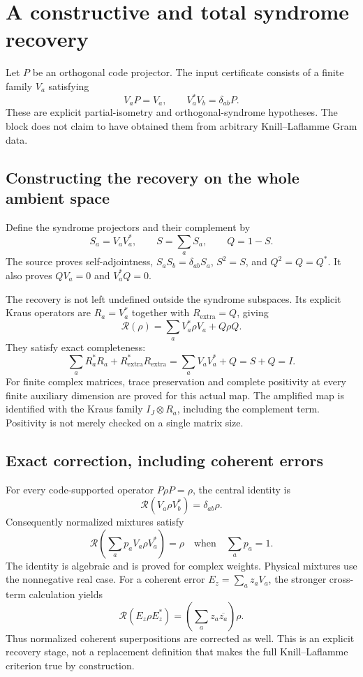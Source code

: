 \section{A constructive and total syndrome recovery}\label{supp4:section:003}
Let $P$ be an orthogonal code projector. The input certificate consists of a finite family $V_a$ satisfying
\[
V_aP=V_a,
\qquad
V_a^*V_b=\delta_{ab}P.
\]
These are explicit partial-isometry and orthogonal-syndrome hypotheses. The block does not claim to have obtained them from arbitrary Knill--Laflamme Gram data.

\subsection{Constructing the recovery on the whole ambient space}
Define the syndrome projectors and their complement by
\[
S_a=V_aV_a^*,\qquad S=\sum_aS_a,\qquad Q=1-S.
\]
The source proves self-adjointness, $S_aS_b=\delta_{ab}S_a$, $S^2=S$, and $Q^2=Q=Q^*$. It also proves $QV_a=0$ and $V_a^*Q=0$.

The recovery is not left undefined outside the syndrome subspaces. Its explicit Kraus operators are $R_a=V_a^*$ together with $R_{\mathrm{extra}}=Q$, giving
\[
\mathcal R(\rho)=\sum_aV_a^*\rho V_a+Q\rho Q.
\]
They satisfy exact completeness:
\[
\sum_aR_a^*R_a+R_{\mathrm{extra}}^*R_{\mathrm{extra}}
=\sum_aV_aV_a^*+Q=S+Q=I.
\]
For finite complex matrices, trace preservation and complete positivity at every finite auxiliary dimension are proved for this actual map. The amplified map is identified with the Kraus family $I_J\otimes R_a$, including the complement term. Positivity is not merely checked on a single matrix size.

\subsection{Exact correction, including coherent errors}
For every code-supported operator $P\rho P=\rho$, the central identity is
\[
\boxed{\mathcal R(V_a\rho V_b^*)=\delta_{ab}\rho.}
\]
Consequently normalized mixtures satisfy
\[
\mathcal R\!\left(\sum_ap_aV_a\rho V_a^*\right)=\rho
\quad\text{when}\quad\sum_ap_a=1.
\]
The identity is algebraic and is proved for complex weights. Physical mixtures use the nonnegative real case. For a coherent error $E_z=\sum_a z_aV_a$, the stronger cross-term calculation yields
\[
\mathcal R(E_z\rho E_z^*)=\left(\sum_a z_a\overline{z_a}\right)\rho.
\]
Thus normalized coherent superpositions are corrected as well. This is an explicit recovery stage, not a replacement definition that makes the full Knill--Laflamme criterion true by construction.



